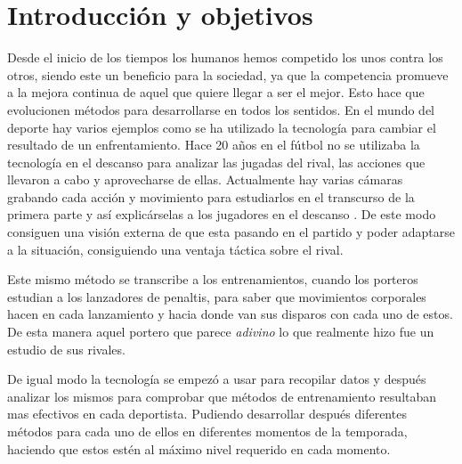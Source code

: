 \chapter{Introducción y objetivos}
\label{cap: Introducción y objetivos}


Desde el inicio de los tiempos los humanos hemos competido los unos contra los otros,
siendo este un beneficio para la sociedad, ya que la competencia promueve a la mejora
continua de aquel que quiere llegar a ser el mejor. Esto hace que evolucionen métodos
para desarrollarse en todos los sentidos. En el mundo del deporte hay varios ejemplos
como se ha utilizado la tecnología para cambiar el resultado de un enfrentamiento.
Hace 20 años en el fútbol no se utilizaba la tecnología en el descanso para analizar
las jugadas del rival, las acciones que llevaron a cabo y aprovecharse de ellas.
Actualmente hay varias cámaras grabando cada acción y movimiento para estudiarlos
en el transcurso de la primera parte y así explicárselas a los jugadores en el descanso
\cite{futbolDescanso}.
De este modo consiguen una visión externa de que esta pasando en el partido y
poder adaptarse a la situación, consiguiendo una ventaja táctica sobre el rival.

Este mismo método se transcribe a los entrenamientos, cuando los porteros estudian
a los lanzadores de penaltis, para saber que movimientos corporales hacen en cada
lanzamiento y hacia donde van sus disparos con cada uno de estos. De esta manera
aquel portero que parece \textit{adivino} lo que realmente hizo fue un estudio
de sus rivales.

De igual modo la tecnología se empezó a usar para recopilar datos y después analizar
los mismos para comprobar que métodos de entrenamiento resultaban mas efectivos
en cada deportista. Pudiendo desarrollar después diferentes métodos para cada
uno de ellos en diferentes momentos de la temporada, haciendo que estos estén
al máximo nivel requerido en cada momento.

